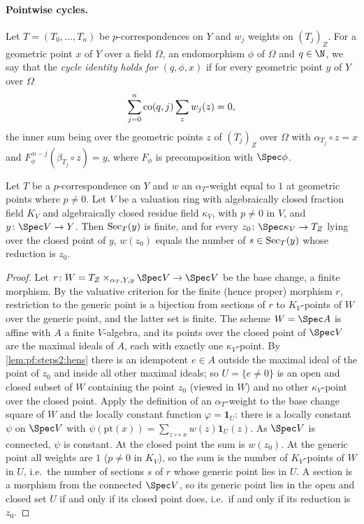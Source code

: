 \paragraph{Pointwise cycles.}
Let $T=(T_0,\dots,T_n)$ be $p$-correspondences on $Y$ and $w_j$ weights on $(T_j)_Z$. For a geometric
point $x$ of $Y$ over a field $\Omega$, an endomorphism $\phi$ of $\Omega$ and $q\in\N$, we say that the
\emph{cycle identity holds for $(q,\phi,x)$} if for every geometric point $y$ of $Y$ over $\Omega$
\begin{equation}\label{eq:pf:steps2:cycid}
  \sum_{j=0}^n\mathrm{co}(q,j)\sum_{z}w_j(z)=0,
\end{equation}
the inner sum being over the geometric points $z$ of $(T_j)_Z$ over $\Omega$ with $\alpha_{T_j}\circ
z=x$ and $F_\phi^{\,n-j}(\beta_{T_j}\circ z)=y$, where $F_\phi$ is precomposition with $\Spec\phi$.

\begin{lemma}\label{lem:pf:steps2:wtval}
Let $T$ be a $p$-correspondence on $Y$ and $w$ an $\alpha_T$-weight equal to $1$ at geometric points
where $p\ne0$. Let $V$ be a valuation ring with algebraically closed fraction field $K_V$ and
algebraically closed residue field $\kappa_V$, with $p\ne0$ in $V$, and $y\colon\Spec V\to Y$. Then
$\mathrm{Sec}_T(y)$ is finite, and for every $z_0\colon\Spec\kappa_V\to T_Z$ lying over the closed point
of $y$, $w(z_0)$ equals the number of $s\in\mathrm{Sec}_T(y)$ whose reduction is $z_0$.
\end{lemma}

\begin{proof}
Let $r\colon W=T_Z\times_{\alpha_T,Y,y}\Spec V\to\Spec V$ be the base change, a finite morphism. By the
valuative criterion for the finite (hence proper) morphism $r$, restriction to the generic point is a
bijection from sections of $r$ to $K_V$-points of $W$ over the generic point, and the latter set is
finite. The scheme $W=\Spec A$ is affine with $A$ a finite $V$-algebra, and its points over the closed
point of $\Spec V$ are the maximal ideals of $A$, each with exactly one $\kappa_V$-point. By
\cref{lem:pf:steps2:hens} there is an idempotent $e\in A$ outside the maximal ideal of the point of
$z_0$ and inside all other maximal ideals; so $U=\{e\ne0\}$ is an open and closed subset of $W$
containing the point $z_0$ (viewed in $W$) and no other $\kappa_V$-point over the closed point. Apply
the definition of an $\alpha_T$-weight to the base change
square of $W$ and the locally constant function $\varphi=\mathbf 1_U$: there is a locally constant
$\psi$ on $\Spec V$ with $\psi(\mathrm{pt}(x))=\sum_{z\mapsto x}w(z)\mathbf 1_U(z)$. As $\Spec V$ is
connected, $\psi$ is constant. At the closed point the sum is $w(z_0)$. At the generic point all
weights are $1$ ($p\ne0$ in $K_V$), so the sum is the number of $K_V$-points of $W$ in $U$, i.e.\ the
number of sections $s$ of $r$ whose generic point lies in $U$. A section is a morphism from the
connected $\Spec V$, so its generic point lies in the open and closed set $U$ if and only if its
closed point does, i.e.\ if and only if its reduction is $z_0$.
\end{proof}

